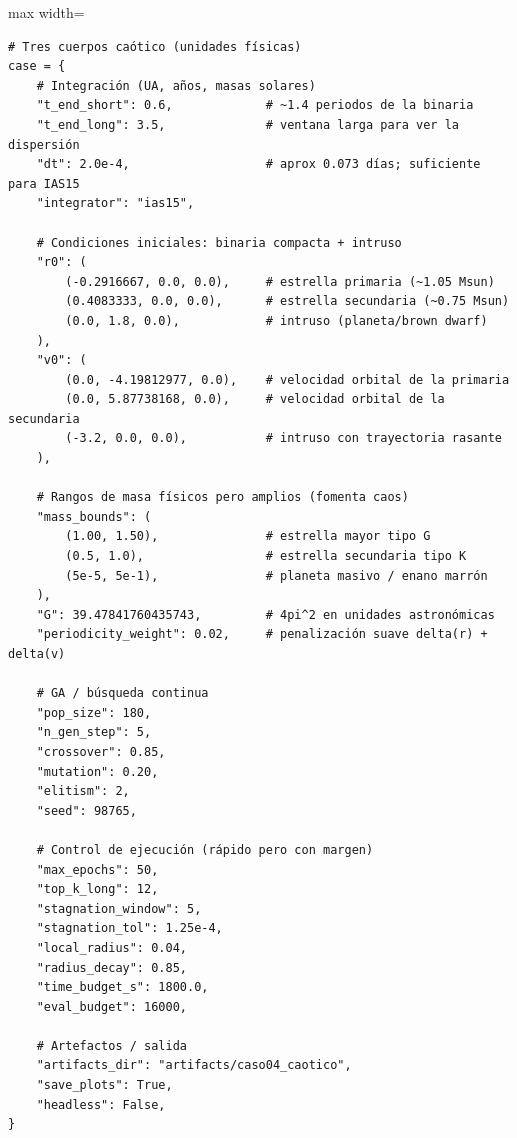\begin{listing}[H]
\caption{Declaración del diccionario \texttt{case} en el notebook Caso04}
\label{lst:c04_case}
\begin{adjustbox}{max width=\textwidth}
\begin{minipage}{\textwidth}
\begin{verbatim}
# Tres cuerpos caótico (unidades físicas)
case = {
    # Integración (UA, años, masas solares)
    "t_end_short": 0.6,             # ~1.4 periodos de la binaria
    "t_end_long": 3.5,              # ventana larga para ver la dispersión
    "dt": 2.0e-4,                   # aprox 0.073 días; suficiente para IAS15
    "integrator": "ias15",

    # Condiciones iniciales: binaria compacta + intruso
    "r0": (
        (-0.2916667, 0.0, 0.0),     # estrella primaria (~1.05 Msun)
        (0.4083333, 0.0, 0.0),      # estrella secundaria (~0.75 Msun)
        (0.0, 1.8, 0.0),            # intruso (planeta/brown dwarf)
    ),
    "v0": (
        (0.0, -4.19812977, 0.0),    # velocidad orbital de la primaria
        (0.0, 5.87738168, 0.0),     # velocidad orbital de la secundaria
        (-3.2, 0.0, 0.0),           # intruso con trayectoria rasante
    ),

    # Rangos de masa físicos pero amplios (fomenta caos)
    "mass_bounds": (
        (1.00, 1.50),               # estrella mayor tipo G
        (0.5, 1.0),                 # estrella secundaria tipo K
        (5e-5, 5e-1),               # planeta masivo / enano marrón
    ),
    "G": 39.47841760435743,         # 4pi^2 en unidades astronómicas
    "periodicity_weight": 0.02,     # penalización suave delta(r) + delta(v)

    # GA / búsqueda continua
    "pop_size": 180,
    "n_gen_step": 5,
    "crossover": 0.85,
    "mutation": 0.20,
    "elitism": 2,
    "seed": 98765,

    # Control de ejecución (rápido pero con margen)
    "max_epochs": 50,
    "top_k_long": 12,
    "stagnation_window": 5,
    "stagnation_tol": 1.25e-4,
    "local_radius": 0.04,
    "radius_decay": 0.85,
    "time_budget_s": 1800.0,
    "eval_budget": 16000,

    # Artefactos / salida
    "artifacts_dir": "artifacts/caso04_caotico",
    "save_plots": True,
    "headless": False,
}
\end{verbatim}
\end{minipage}
\end{adjustbox}
\end{listing}


